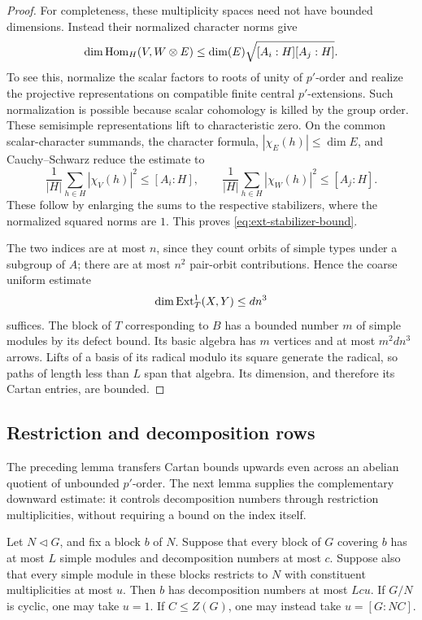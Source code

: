 \begin{proof}
For completeness, these multiplicity spaces need not have bounded
dimensions.  Instead their normalized character norms give
\begin{equation}
 \dim\operatorname{Hom}_H(V,W\otimes E)
 \le \dim(E)\sqrt{[A_i:H][A_j:H]} .
 \label{eq:ext-stabilizer-bound}
\end{equation}
To see this, normalize the scalar factors to roots of unity of
\(p'\)-order and realize the projective representations on compatible
finite central \(p'\)-extensions.  Such normalization is possible
because scalar cohomology is killed by the group order.  These
semisimple representations lift to characteristic zero.
On the common scalar-character summands, the character formula,
\(|\chi_E(h)|\le\dim E\), and Cauchy--Schwarz reduce the estimate to
\[
 \frac1{|H|}\sum_{h\in H}|\chi_V(h)|^2\le[A_i:H],
 \qquad
 \frac1{|H|}\sum_{h\in H}|\chi_W(h)|^2\le[A_j:H].
\]
These follow by enlarging the sums to the respective stabilizers,
where the normalized squared norms are \(1\).
This proves \eqref{eq:ext-stabilizer-bound}.

The two indices are at most \(n\), since they count orbits of
simple types under a subgroup of \(A\); there are at most \(n^2\)
pair-orbit contributions.  Hence the coarse uniform estimate
\[
 \dim\operatorname{Ext}^1_T(X,Y)\le dn^3
\]
suffices.  The block of \(T\) corresponding to \(B\) has a bounded
number \(m\) of simple modules by its defect bound.
Its basic algebra has \(m\) vertices and at most \(m^2dn^3\)
arrows.  Lifts of a basis of its radical modulo its square generate
the radical, so paths of length less than \(L\) span that algebra.
Its dimension, and therefore its Cartan entries, are bounded.
\end{proof}

\subsection{Restriction and decomposition rows}

The preceding lemma transfers Cartan bounds upwards even across
an abelian quotient of unbounded $p'$-order.  The next lemma supplies
the complementary downward estimate: it controls decomposition
numbers through restriction multiplicities, without requiring a
bound on the index itself.

\begin{lemma}
\label{lem:restriction-rows}
Let \(N\lhd G\), and fix a block \(b\) of \(N\).
Suppose that every block of \(G\) covering \(b\) has at most
\(L\) simple modules and decomposition numbers at most \(c\).
Suppose also that every simple module in these blocks restricts to
\(N\) with constituent multiplicities at most \(u\).
Then \(b\) has decomposition numbers at most
\(Lcu\).
If \(G/N\) is cyclic, one may take \(u=1\).
If \(C\le Z(G)\), one may instead take \(u=[G:NC]\).
\end{lemma}

